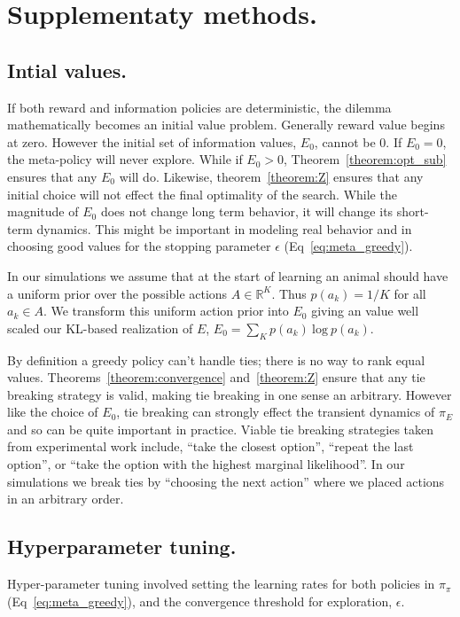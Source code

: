 \documentclass[9pt,twocolumn,twoside]{pnas-new}
\begin{document}
\clearpage
\newpage
\section*{Supplementaty methods.}
\subsection*{Intial values.} If both reward and information policies are deterministic, the dilemma mathematically becomes an initial value problem. Generally reward value begins at zero. However the initial set of information values, $E_0$, cannot be 0. If $E_0 = 0$, the meta-policy will never explore. While if $E_0 > 0$, Theorem~\ref{theorem:opt_sub} ensures that any $E_0$ will do. Likewise, theorem~\ref{theorem:Z} ensures that any initial choice will not effect the final optimality of the search. While the magnitude of $E_0$ does not change long term behavior, it will change its short-term dynamics. This might be important in modeling real behavior and in choosing good values for the stopping parameter $\epsilon$ (Eq~\ref{eq:meta_greedy}). 

In our simulations we assume that at the start of learning an animal should have a uniform prior over the possible actions $A \in \mathbb{R}^K$. Thus $p(a_k) = 1/K$ for all $a_k \in A$. We transform this uniform action prior into $E_0$ giving an value well scaled our KL-based realization of $E$, $E_0 = \sum_K p(a_k)\ \text{log}\ p(a_k)$. 

By definition a greedy policy can't handle ties; there is no way to rank equal values. Theorems~\ref{theorem:convergence} and~\ref{theorem:Z} ensure that any tie breaking strategy is valid, making tie breaking in one sense an arbitrary. However like the choice of $E_0$, tie breaking can strongly effect the transient dynamics of $\pi_E$ and so can be quite important in practice. Viable tie breaking strategies taken from experimental work include, ``take the closest option'', ``repeat the last option'', or ``take the option with the highest marginal likelihood''. In our simulations we break ties by ``choosing the next action'' where we placed actions in an arbitrary order.

\subsection*{Hyperparameter tuning.}
Hyper-parameter tuning involved setting the learning rates for both policies in $\pi_{\pi}$ (Eq~\ref{eq:meta_greedy}), and the convergence threshold for exploration, $\epsilon$. 
\end{document}
